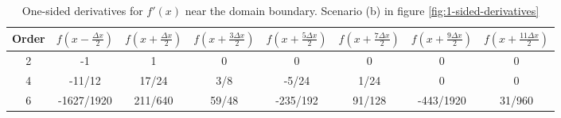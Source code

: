 \begin{table}[h]
  \centering
  \begin{tabular}{cccccccc}
    Order & $f\left(x - \frac{\Delta x}{2}\right)$ & $f\left(x + \frac{\Delta x}{2}\right)$ & $f\left(x + \frac{3\Delta x}{2}\right)$ & $f\left(x + \frac{5\Delta x}{2}\right)$ & $f\left(x + \frac{7\Delta x}{2}\right)$ & $f\left(x + \frac{9\Delta x}{2}\right)$ & $f\left(x + \frac{11\Delta x}{2}\right)$ \\ \hline
    2 & -1 & 1 & 0 & 0 & 0 & 0 & 0 \\ \hline
    4 & -11/12 & 17/24 & 3/8 & -5/24 & 1/24 & 0 & 0 \\ \hline
    6 & -1627/1920 & 211/640 & 59/48 & -235/192 & 91/128 & -443/1920 & 31/960 \\ \hline
  \end{tabular}
  \caption[One-sided derivatives part 2]{One-sided derivatives for $f'(x)$ near the domain
    boundary. Scenario (b) in figure \ref{fig:1-sided-derivatives}}
  \label{tab:1-sided-b}
\end{table}



